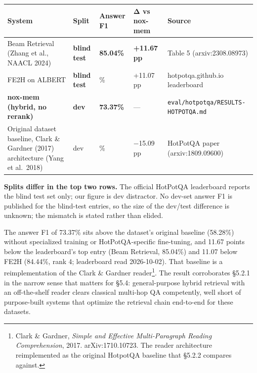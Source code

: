\documentclass[
]{article}
\newcounter{none} %
\begin{document}
{\def\LTcaptype{none} %
\begin{longtable}[]{@{}
  >{\raggedright\arraybackslash}p{}
  >{\raggedright\arraybackslash}p{}
  >{\raggedleft\arraybackslash}p{}
  >{\raggedleft\arraybackslash}p{}
  >{\raggedright\arraybackslash}p{}@{}}
\toprule\noalign{}
\begin{minipage}[b]{\linewidth}\raggedright
System
\end{minipage} & \begin{minipage}[b]{\linewidth}\raggedright
Split
\end{minipage} & \begin{minipage}[b]{\linewidth}\raggedleft
Answer F1
\end{minipage} & \begin{minipage}[b]{\linewidth}\raggedleft
Δ vs nox-mem
\end{minipage} & \begin{minipage}[b]{\linewidth}\raggedright
Source
\end{minipage} \\
\midrule\noalign{}
\endhead
\bottomrule\noalign{}
\endlastfoot
Beam Retrieval (Zhang et al., NAACL 2024) & \textbf{blind test} &
\textbf{85.04\%} & \textbf{+11.67 pp} & Table 5 (arxiv:2308.08973) \\
FE2H on ALBERT & \textbf{blind test} & 84.44\% & +11.07 pp &
hotpotqa.github.io leaderboard \\
\textbf{nox-mem (hybrid, no rerank)} & \textbf{dev} & \textbf{73.37\%} &
--- & \texttt{eval/hotpotqa/RESULTS-HOTPOTQA.md} \\
Original dataset baseline, Clark \& Gardner (2017) architecture (Yang et
al.~2018) & dev & 58.28\% & −15.09 pp & HotPotQA paper
(arxiv:1809.09600) \\
\end{longtable}
}

\textbf{Splits differ in the top two rows.} The official HotPotQA
leaderboard reports the blind test set only; our figure is dev
distractor. No dev-set answer F1 is published for the blind-test
entries, so the size of the dev/test difference is unknown; the mismatch
is stated rather than elided.

The answer F1 of 73.37\% sits above the dataset's original baseline
(58.28\%) without specialized training or HotPotQA-specific fine-tuning,
and 11.67 points below the leaderboard's top entry (Beam Retrieval,
85.04\%) and 11.07 below FE2H (84.44\%, rank 4; leaderboard read
2026-10-02). That baseline is a reimplementation of the Clark \& Gardner
reader\footnote{Clark \& Gardner, \emph{Simple and Effective
  Multi-Paragraph Reading Comprehension}, 2017. arXiv:1710.10723. The
  reader architecture reimplemented as the original HotpotQA baseline
  that §5.2.2 compares against.}. The result corroborates §5.2.1 in the
narrow sense that matters for §5.4: general-purpose hybrid retrieval
with an off-the-shelf reader clears classical multi-hop QA competently,
well short of purpose-built systems that optimize the retrieval chain
end-to-end for these datasets.
\end{document}

